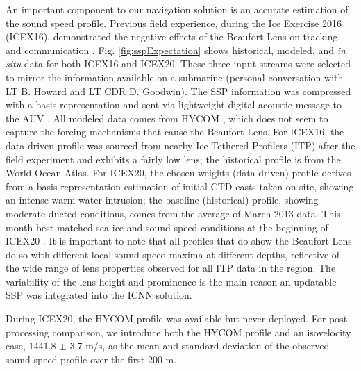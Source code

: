 An important component to our navigation solution is an accurate estimation of the sound speed profile.
Previous field experience, during the Ice Exercise 2016 (ICEX16), demonstrated the negative effects of the Beaufort Lens on tracking and communication \citep{Schmidt2016}.
Fig. \ref{fig:sspExpectation} shows historical, modeled, and \textit{in situ} data for both ICEX16 and ICEX20.
These three input streams were selected to mirror the information available on a submarine (personal conversation with LT B. Howard and LT CDR D. Goodwin). 
The SSP information was compressed with a basis representation and sent via lightweight digital acoustic message to the AUV \citep{bhatt_embedded_2022}. 
All modeled data comes from HYCOM \cite{Chassignet2007}, which does not seem to capture the forcing mechanisms that cause the Beaufort Lens.
For ICEX16, the data-driven profile was sourced from nearby Ice Tethered Profilers (ITP) after the field experiment \cite{Krishfield2008,Toole2011} and exhibits a fairly low lens; the historical profile is from the World Ocean Atlas.
For ICEX20, the chosen weights (data-driven) profile derives from a basis representation estimation of initial CTD casts taken on site, showing an intense warm water intrusion; the baseline (historical) profile, showing moderate ducted conditions, comes from the average of March 2013 data.
This month best matched sea ice and sound speed conditions at the beginning of ICEX20 \citep{bhatt_embedded_2022}.
It is important to note that all profiles that do show the Beaufort Lens do so with different local sound speed maxima at different depths, reflective of the wide range of lens properties observed for all ITP data in the region.
The variability of the lens height and prominence is the main reason an updatable SSP was integrated into the ICNN solution.

During ICEX20, the HYCOM profile was available but never deployed. 
For post-processing comparison, we introduce both the HYCOM profile and an isovelocity case, 1441.8 $\pm$ 3.7 m/s, as the mean and standard deviation of the observed sound speed profile over the first 200 m.

